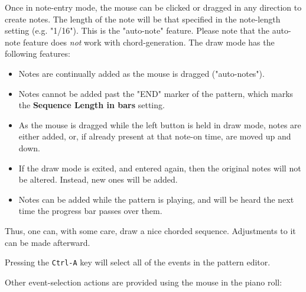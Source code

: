    Once in note-entry mode, the mouse can be clicked or dragged
   in any direction to create notes.
   The length of the note will
   be that specified in the note-length setting (e.g. "1/16").
   This is the "auto-note" feature.
   Please note that the auto-note feature does \textsl{not} work with
   chord-generation.
   The draw mode has the following features:

   \begin{itemize}
      \item Notes are continually added as the mouse is dragged ("auto-notes").
      \item Notes cannot be added past the "END" marker of the pattern, which
         marks the \textbf{Sequence Length in bars} setting.
      \item As the mouse is dragged while the left button is held in draw mode,
         notes are either added, or, if already present at that note-on time,
         are moved up and down.
      \item If the draw mode is exited, and entered again, then the original
         notes will not be altered.  Instead, new ones will be added.
      \item Notes can be added while the pattern is playing, and will be heard
         the next time the progress bar passes over them.
   \end{itemize}

   Thus, one can, with some care, draw a nice chorded sequence.
   Adjustments to it can be made afterward.

   Pressing the \texttt{Ctrl-A} key will select all of the events in the
   pattern editor.

   Other event-selection actions are provided using the mouse in the piano roll:

